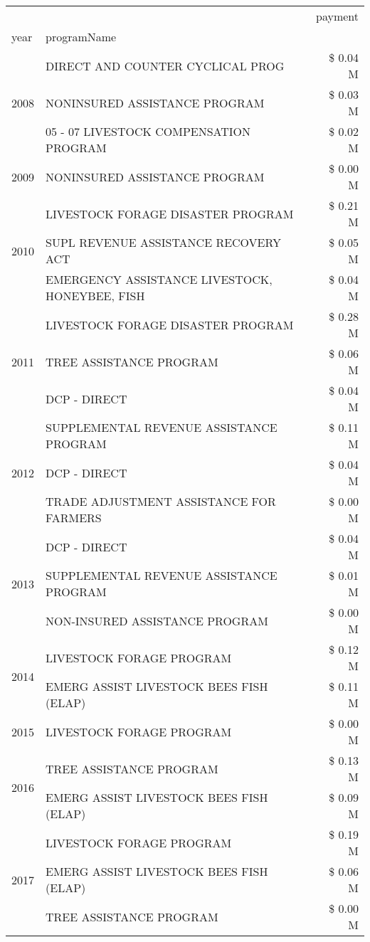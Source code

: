 \begin{tabular}{llr}
\toprule
 &  & payment \\
year & programName &  \\
\midrule
\multirow[t]{3}{*}{2008} & DIRECT AND COUNTER CYCLICAL PROG & \$ 0.04 M \\
 & NONINSURED ASSISTANCE PROGRAM & \$ 0.03 M \\
 & 05 - 07 LIVESTOCK COMPENSATION PROGRAM & \$ 0.02 M \\
\cline{1-3}
2009 & NONINSURED ASSISTANCE PROGRAM & \$ 0.00 M \\
\cline{1-3}
\multirow[t]{3}{*}{2010} & LIVESTOCK FORAGE DISASTER  PROGRAM & \$ 0.21 M \\
 & SUPL REVENUE ASSISTANCE RECOVERY ACT & \$ 0.05 M \\
 & EMERGENCY ASSISTANCE LIVESTOCK, HONEYBEE, FISH & \$ 0.04 M \\
\cline{1-3}
\multirow[t]{3}{*}{2011} & LIVESTOCK FORAGE DISASTER PROGRAM & \$ 0.28 M \\
 & TREE ASSISTANCE PROGRAM & \$ 0.06 M \\
 & DCP - DIRECT & \$ 0.04 M \\
\cline{1-3}
\multirow[t]{3}{*}{2012} & SUPPLEMENTAL REVENUE ASSISTANCE PROGRAM & \$ 0.11 M \\
 & DCP - DIRECT & \$ 0.04 M \\
 & TRADE ADJUSTMENT ASSISTANCE FOR FARMERS & \$ 0.00 M \\
\cline{1-3}
\multirow[t]{3}{*}{2013} & DCP - DIRECT & \$ 0.04 M \\
 & SUPPLEMENTAL REVENUE ASSISTANCE PROGRAM & \$ 0.01 M \\
 & NON-INSURED ASSISTANCE PROGRAM & \$ 0.00 M \\
\cline{1-3}
\multirow[t]{2}{*}{2014} & LIVESTOCK FORAGE PROGRAM & \$ 0.12 M \\
 & EMERG ASSIST LIVESTOCK BEES FISH (ELAP) & \$ 0.11 M \\
\cline{1-3}
2015 & LIVESTOCK FORAGE PROGRAM & \$ 0.00 M \\
\cline{1-3}
\multirow[t]{2}{*}{2016} & TREE ASSISTANCE PROGRAM                       & \$ 0.13 M \\
 & EMERG ASSIST LIVESTOCK BEES FISH (ELAP)       & \$ 0.09 M \\
\cline{1-3}
\multirow[t]{3}{*}{2017} & LIVESTOCK FORAGE PROGRAM & \$ 0.19 M \\
 & EMERG ASSIST LIVESTOCK BEES FISH (ELAP) & \$ 0.06 M \\
 & TREE ASSISTANCE PROGRAM & \$ 0.00 M \\

\end{tabular}
